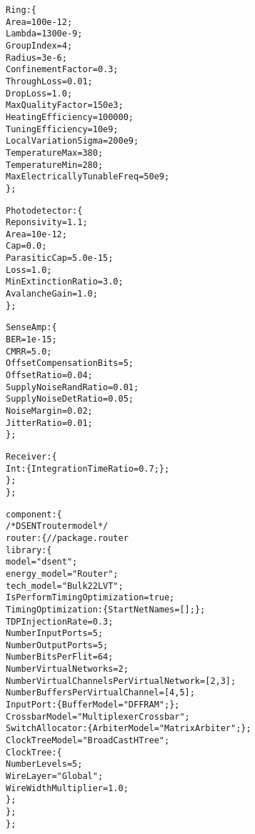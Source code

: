{\begin{alltt}
            Ring: \{
                Area = 100e-12;
                Lambda = 1300e-9;
                GroupIndex = 4;
                Radius = 3e-6;
                ConfinementFactor = 0.3;
                ThroughLoss = 0.01;
                DropLoss = 1.0;
                MaxQualityFactor = 150e3;
                HeatingEfficiency = 100000;
                TuningEfficiency = 10e9;
                LocalVariationSigma = 200e9;
                TemperatureMax = 380;
                TemperatureMin = 280;
                MaxElectricallyTunableFreq = 50e9;
            \};
            
            Photodetector: \{
                Reponsivity = 1.1;
                Area = 10e-12;
                Cap = 0.0;
                ParasiticCap = 5.0e-15;
                Loss = 1.0;
                MinExtinctionRatio = 3.0;
                AvalancheGain = 1.0;
            \};
            
            SenseAmp: \{
                BER = 1e-15;
                CMRR = 5.0;
                OffsetCompensationBits = 5;
                OffsetRatio = 0.04;
                SupplyNoiseRandRatio = 0.01;
                SupplyNoiseDetRatio = 0.05;
                NoiseMargin = 0.02;
                JitterRatio = 0.01;
            \};
            
            Receiver: \{
                Int: \{ IntegrationTimeRatio = 0.7; \};
            \};
        \};
        
        component: \{
            /* DSENT router model */
            router: \{ // package.router
                library: \{
                    model = "dsent";
                    energy_model = "Router";
                    tech_model = "Bulk22LVT";
                    IsPerformTimingOptimization = true;
                    TimingOptimization: \{ StartNetNames = []; \};
                    TDPInjectionRate = 0.3;
                    NumberInputPorts = 5;
                    NumberOutputPorts = 5;
                    NumberBitsPerFlit = 64;
                    NumberVirtualNetworks = 2;
                    NumberVirtualChannelsPerVirtualNetwork = [2, 3];
                    NumberBuffersPerVirtualChannel = [4, 5];
                    InputPort: \{ BufferModel = "DFFRAM"; \};
                    CrossbarModel = "MultiplexerCrossbar";
                    SwitchAllocator: \{ ArbiterModel = "MatrixArbiter"; \};
                    ClockTreeModel = "BroadCastHTree";
                    ClockTree: \{
                        NumberLevels = 5;
                        WireLayer = "Global";
                        WireWidthMultiplier = 1.0;
                    \};
                \};
            \};
            

\end{alltt}}
